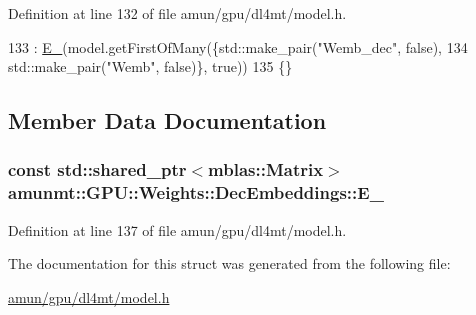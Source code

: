 Definition at line 132 of file amun/gpu/dl4mt/model.\+h.


\begin{DoxyCode}
133     : \hyperlink{structamunmt_1_1GPU_1_1Weights_1_1DecEmbeddings_a947d12f7b900692a2cb55e2dbd3e53bd}{E\_}(model.getFirstOfMany(\{std::make\_pair(\textcolor{stringliteral}{"Wemb\_dec"}, false),
134                                std::make\_pair(\textcolor{stringliteral}{"Wemb"}, false)\}, \textcolor{keyword}{true}))
135     \{\}
\end{DoxyCode}


\subsection{Member Data Documentation}
\subsubsection[{\texorpdfstring{E\+\_\+}{E_}}]{\setlength{\rightskip}{0pt plus 5cm}const std\+::shared\+\_\+ptr$<${\bf mblas\+::\+Matrix}$>$ amunmt\+::\+G\+P\+U\+::\+Weights\+::\+Dec\+Embeddings\+::\+E\+\_\+}\hypertarget{structamunmt_1_1GPU_1_1Weights_1_1DecEmbeddings_a947d12f7b900692a2cb55e2dbd3e53bd}{}\label{structamunmt_1_1GPU_1_1Weights_1_1DecEmbeddings_a947d12f7b900692a2cb55e2dbd3e53bd}


Definition at line 137 of file amun/gpu/dl4mt/model.\+h.



The documentation for this struct was generated from the following file\+:\begin{DoxyCompactItemize}
\item 
\hyperlink{amun_2gpu_2dl4mt_2model_8h}{amun/gpu/dl4mt/model.\+h}\end{DoxyCompactItemize}
